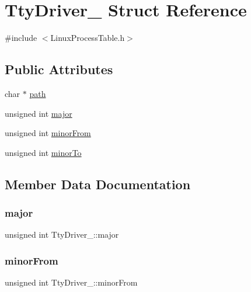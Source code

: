 \hypertarget{structTtyDriver__}{}\section{Tty\+Driver\+\_\+ Struct Reference}
\label{structTtyDriver__}


{\ttfamily \#include $<$Linux\+Process\+Table.\+h$>$}

\subsection*{Public Attributes}
\begin{DoxyCompactItemize}
\item 
char $\ast$ \hyperlink{structTtyDriver___a98edd75a405aa89b6b7a5ea2e0f0d2bd}{path}
\item 
unsigned int \hyperlink{structTtyDriver___a25178f65a291049e3f26712cef7ee1c0}{major}
\item 
unsigned int \hyperlink{structTtyDriver___ad31f78f71142f90713171a34fa9cfe1e}{minor\+From}
\item 
unsigned int \hyperlink{structTtyDriver___aeebb092707677fdb1d8a09f5eeeaa882}{minor\+To}
\end{DoxyCompactItemize}


\subsection{Member Data Documentation}
\mbox{\label{structTtyDriver___a25178f65a291049e3f26712cef7ee1c0}} 
\subsubsection{\texorpdfstring{major}{major}}
{\footnotesize\ttfamily unsigned int Tty\+Driver\+\_\+\+::major}

\mbox{\label{structTtyDriver___ad31f78f71142f90713171a34fa9cfe1e}} 
\subsubsection{\texorpdfstring{minor\+From}{minorFrom}}
{\footnotesize\ttfamily unsigned int Tty\+Driver\+\_\+\+::minor\+From}

